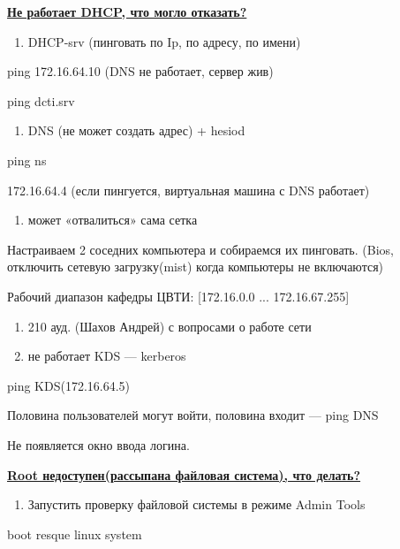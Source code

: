 \par 
\underline{\textbf{Не работает DHCP, что могло отказать?}}
\begin{enumerate}
	\item \par 
	DHCP-srv (пинговать по Ip, по адресу, по имени)
\end{enumerate}
\par 
ping 172.16.64.10 (DNS не работает, сервер жив)
\par 
ping dcti.srv
\begin{enumerate}
	\item \par 
	DNS (не может создать адрес) + hesiod
\end{enumerate}
\par 
ping ns
\par 
        172.16.64.4
(если пингуется, виртуальная машина с
DNS работает)
\begin{enumerate}
	\item \par 
	может «отвалиться» сама сетка
\end{enumerate}
\par 
Настраиваем 2 соседних компьютера и
собираемся их пинговать. (Bios, отключить
сетевую загрузку(mist) когда компьютеры
не включаются)
\par 
Рабочий диапазон кафедры ЦВТИ: [172.16.0.0
... 172.16.67.255]
\begin{enumerate}
	\item \par 
	210 ауд. (Шахов Андрей) с вопросами о
	работе сети
	\item \par 
	не работает KDS — kerberos
\end{enumerate}
\par 
ping KDS(172.16.64.5)
\par 
Половина пользователей могут войти,
половина входит — ping DNS
\par 
Не появляется окно ввода логина.
\par 
\underline{\textbf{Root недоступен(рассыпана файловая
система), что делать?}}
\begin{enumerate}
	\item \par 
	Запустить проверку файловой системы
	в режиме Admin Tools
\end{enumerate}
\par 
boot resque linux system
\par 
